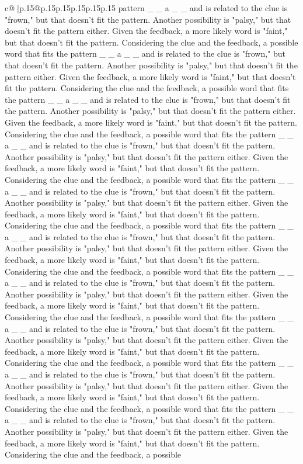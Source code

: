 \documentclass{article}
\begin{document}
{\begin{supertabular}{c@{$\;$}|p{.15\linewidth}@{}p{.15\linewidth}p{.15\linewidth}p{.15\linewidth}p{.15\linewidth}p{.15\linewidth}}
{{{pattern \_ \_ a \_ \_ and is related to the clue is "frown," but that doesn't fit the pattern. Another possibility is "palsy," but that doesn't fit the pattern either. Given the feedback, a more likely word is "faint," but that doesn't fit the pattern. Considering the clue and the feedback, a possible word that fits the pattern \_ \_ a \_ \_ and is related to the clue is "frown," but that doesn't fit the pattern. Another possibility is "palsy," but that doesn't fit the pattern either. Given the feedback, a more likely word is "faint," but that doesn't fit the pattern. Considering the clue and the feedback, a possible word that fits the pattern \_ \_ a \_ \_ and is related to the clue is "frown," but that doesn't fit the pattern. Another possibility is "palsy," but that doesn't fit the pattern either. Given the feedback, a more likely word is "faint," but that doesn't fit the pattern. Considering the clue and the feedback, a possible word that fits the pattern \_ \_ a \_ \_ and is related to the clue is "frown," but that doesn't fit the pattern. Another possibility is "palsy," but that doesn't fit the pattern either. Given the feedback, a more likely word is "faint," but that doesn't fit the pattern. Considering the clue and the feedback, a possible word that fits the pattern \_ \_ a \_ \_ and is related to the clue is "frown," but that doesn't fit the pattern. Another possibility is "palsy," but that doesn't fit the pattern either. Given the feedback, a more likely word is "faint," but that doesn't fit the pattern. Considering the clue and the feedback, a possible word that fits the pattern \_ \_ a \_ \_ and is related to the clue is "frown," but that doesn't fit the pattern. Another possibility is "palsy," but that doesn't fit the pattern either. Given the feedback, a more likely word is "faint," but that doesn't fit the pattern. Considering the clue and the feedback, a possible word that fits the pattern \_ \_ a \_ \_ and is related to the clue is "frown," but that doesn't fit the pattern. Another possibility is "palsy," but that doesn't fit the pattern either. Given the feedback, a more likely word is "faint," but that doesn't fit the pattern. Considering the clue and the feedback, a possible word that fits the pattern \_ \_ a \_ \_ and is related to the clue is "frown," but that doesn't fit the pattern. Another possibility is "palsy," but that doesn't fit the pattern either. Given the feedback, a more likely word is "faint," but that doesn't fit the pattern. Considering the clue and the feedback, a possible word that fits the pattern \_ \_ a \_ \_ and is related to the clue is "frown," but that doesn't fit the pattern. Another possibility is "palsy," but that doesn't fit the pattern either. Given the feedback, a more likely word is "faint," but that doesn't fit the pattern. Considering the clue and the feedback, a possible word that fits the pattern \_ \_ a \_ \_ and is related to the clue is "frown," but that doesn't fit the pattern. Another possibility is "palsy," but that doesn't fit the pattern either. Given the feedback, a more likely word is "faint," but that doesn't fit the pattern. Considering the clue and the feedback, a possible }}}
\end{supertabular}}
\end{document}

